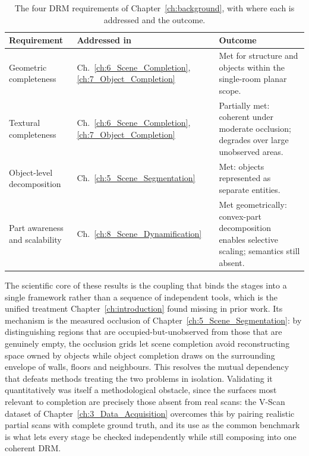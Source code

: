 \begin{table}[hbtp]
\centering
\caption[Requirement evaluation]{The four \gls{DRM} requirements of Chapter~\ref{ch:background}, with where each is addressed and the outcome.}
\label{tab:9_requirements}
\footnotesize
\renewcommand{\arraystretch}{1.3}
\begin{tabularx}{\textwidth}{@{}p{4.6cm}p{1.7cm}X@{}}
\toprule
\textbf{Requirement} & \textbf{Addressed in} & \textbf{Outcome} \\
\midrule
Geometric completeness & Ch.~\ref{ch:6_Scene_Completion}, \ref{ch:7_Object_Completion} & Met for structure and objects within the single-room planar scope. \\
Textural completeness & Ch.~\ref{ch:6_Scene_Completion}, \ref{ch:7_Object_Completion} & Partially met: coherent under moderate occlusion; degrades over large unobserved areas. \\
Object-level decomposition & Ch.~\ref{ch:5_Scene_Segmentation} & Met: objects represented as separate entities. \\
Part awareness and scalability & Ch.~\ref{ch:8_Scene_Dynamification} & Met geometrically: convex-part decomposition enables selective scaling; semantics still absent. \\
\bottomrule
\end{tabularx}
\end{table}

The scientific core of these results is the coupling that binds the stages into a single framework rather than a sequence of independent tools, which is the unified treatment Chapter~\ref{ch:introduction} found missing in prior work. Its mechanism is the measured occlusion of Chapter~\ref{ch:5_Scene_Segmentation}: by distinguishing regions that are occupied-but-unobserved from those that are genuinely empty, the occlusion grids let scene completion avoid reconstructing space owned by objects while object completion draws on the surrounding envelope of walls, floors and neighbours. This resolves the mutual dependency that defeats methods treating the two problems in isolation. Validating it quantitatively was itself a methodological obstacle, since the surfaces most relevant to completion are precisely those absent from real scans: the V-Scan dataset of Chapter~\ref{ch:3_Data_Acquisition} overcomes this by pairing realistic partial scans with complete ground truth, and its use as the common benchmark is what lets every stage be checked independently while still composing into one coherent \gls{DRM}.

